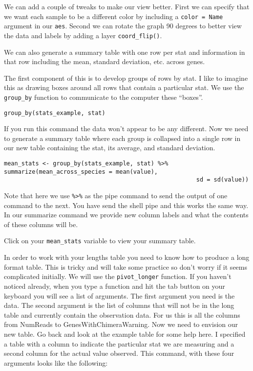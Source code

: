 \documentclass[
]{book}
\begin{document}
We can add a couple of tweaks to make our view better. First we can specify that we want each sample to be a different color by including a \texttt{color\ =\ Name} argument in our \texttt{aes}. Second we can rotate the graph 90 degrees to better view the data and labels by adding a layer \texttt{coord\_flip()}.

We can also generate a summary table with one row per stat and information in that row including the mean, standard deviation, etc. across genes.

The first component of this is to develop groups of rows by stat.
I like to imagine this as drawing boxes around all rows that contain a particular stat.
We use the \texttt{group\_by} function to communicate to the computer these ``boxes''.

\begin{verbatim}
group_by(stats_example, stat)
\end{verbatim}

If you run this command the data won't appear to be any different.
Now we need to generate a summary table where each group is collapsed into a single row in our new table containing the stat, its average, and standard deviation.

\begin{verbatim}
mean_stats <- group_by(stats_example, stat) %>% summarize(mean_across_species = mean(value),
                                                       sd = sd(value))
\end{verbatim}

Note that here we use \texttt{\%\textgreater{}\%} as the pipe command to send the output of one command to the next.
You have send the shell pipe \texttt{\textbar{}} and this works the same way. In our summarize command we provide
new column labels and what the contents of these columns will be.

Click on your \texttt{mean\_stats} variable to view your summary table.

In order to work with your lengths table you need to know how to produce a long format table.
This is tricky and will take some practice so don't worry if it seems complicated initially.
We will use the \texttt{pivot\_longer} function.
If you haven't noticed already, when you type a function and hit the tab button on your keyboard you will see a list of arguments.
The first argument you need is the data.
The second argument is the list of columns that will not be in the long table and currently contain the observation data.
For us this is all the columns from NumReads to GenesWithChimeraWarning.
Now we need to envision our new table. Go back and look at the example table for some help here.
I specified a table with a column to indicate the particular stat we are measuring and
a second column for the actual value observed.
This command, with these four arguments looks like the following:
\end{document}
